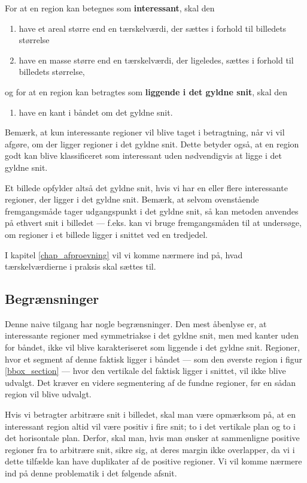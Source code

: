 {\noindent For at en region kan betegnes som \textbf{interessant}, skal den
\begin{enumerate}\label{naiv_regler}
        \renewcommand{\labelenumi}{(\alph{enumi})}
    \item have et areal større end en tærskelværdi, der sættes i
        forhold til billedets størrelse
    \item have en masse større end en tærskelværdi, der ligeledes,
        sættes i forhold til billedets størrelse,
\end{enumerate}
og for at en region kan betragtes som \textbf{liggende i det gyldne
snit}, skal den
\begin{enumerate}
        \renewcommand{\labelenumi}{(\alph{enumi})}
        \setcounter{enumi}{2}
    \item have en kant i båndet om det gyldne snit.
\end{enumerate}

Bemærk, at kun interessante regioner vil blive taget i betragtning, når
vi vil afgøre, om der ligger regioner i det gyldne snit. Dette betyder
også, at en region godt kan blive klassificeret som interessant uden
nødvendigvis at ligge i det gyldne snit.

Et billede opfylder altså det gyldne snit, hvis vi har en eller flere
interessante regioner, der ligger i det gyldne snit. Bemærk, at selvom
ovenstående fremgangsmåde tager udgangspunkt i det gyldne snit, så kan
metoden anvendes på ethvert snit i billedet --- f.eks. kan vi bruge
fremgangsmåden til at undersøge, om regioner i et billede ligger i
snittet ved en tredjedel.

I kapitel \ref{chap_afproevning} vil vi komme nærmere ind på, hvad
tærskelværdierne i praksis skal sættes til.

\subsection{Begrænsninger}
Denne naive tilgang har nogle begrænsninger.  Den mest åbenlyse er, at
interessante regioner med symmetriakse i det gyldne snit, men med kanter uden for
båndet, ikke vil blive karakteriseret som liggende i det gyldne snit.
Regioner, hvor et segment af denne faktisk ligger i båndet --- som den
øverste region i figur \ref{bbox_section} --- hvor den vertikale del faktisk
ligger i snittet, vil ikke blive udvalgt.  Det kræver en videre
segmentering af de fundne regioner, før en sådan region vil blive
udvalgt.

Hvis vi betragter arbitrære snit i billedet, skal man være opmærksom på,
at en interessant region altid vil være positiv i fire snit; to i det
vertikale plan og to i det horisontale plan. Derfor, skal man, hvis man
ønsker at sammenligne positive regioner fra to arbitrære snit, sikre
sig, at deres margin ikke overlapper, da vi i dette tilfælde kan have
duplikater af de positive regioner. Vi vil komme nærmere ind på denne
problematik i det følgende afsnit.

}

